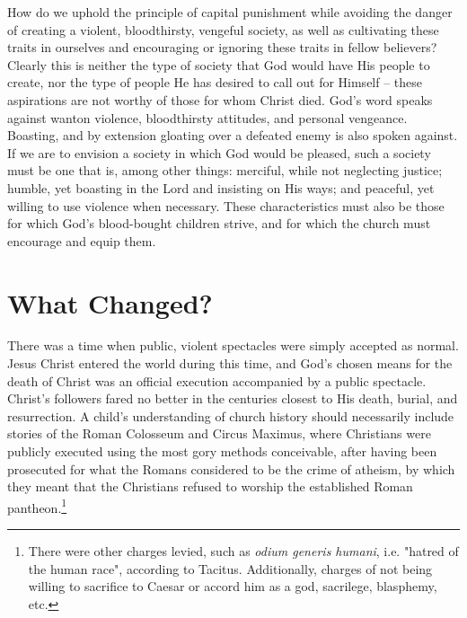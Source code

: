  How do we uphold the principle of capital punishment while avoiding the danger of creating a violent, bloodthirsty, vengeful society, as well as cultivating these traits in ourselves and encouraging or ignoring these traits in fellow believers?  Clearly this is neither the type of society that God would have His people to create, nor the type of people He has desired to call out for Himself -- these aspirations are not worthy of those for whom Christ died.  God's word speaks against wanton violence, bloodthirsty attitudes, and personal vengeance.  Boasting, and by extension gloating over a defeated enemy is also spoken against.  If we are to envision a society in which God would be pleased, such a society must be one that is, among other things: merciful, while not neglecting justice; humble, yet boasting in the Lord and insisting on His ways; and peaceful, yet willing to use violence when necessary.  These characteristics must also be those for which God's blood-bought children strive, and for which the church must encourage and equip them.

\ifdefined\embedversion\newpage\fi
\section{What Changed?}
There was a time when public, violent spectacles were simply accepted as normal.  Jesus Christ entered the world during this time, and God's chosen means for the death of Christ was an official execution accompanied by a public spectacle.  Christ's followers fared no better in the centuries closest to His death, burial, and resurrection.  A child's understanding of church history should necessarily include stories of the Roman Colosseum and Circus Maximus, where Christians were publicly executed using the most gory methods conceivable, after having been prosecuted for what the Romans considered to be the crime of atheism, by which they meant that the Christians refused to worship the established Roman pantheon.\footnote{There were other charges levied, such as \textit{odium generis humani}, i.e. "hatred of the human race", according to Tacitus.  Additionally, charges of not being willing to sacrifice to Caesar or accord him as a god, sacrilege, blasphemy, etc.}

